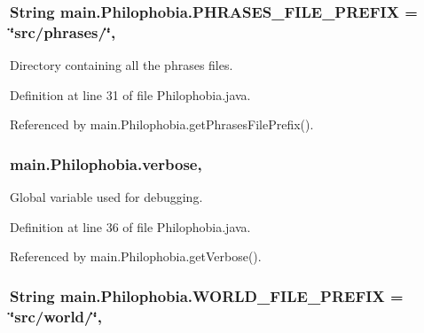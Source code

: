 \hypertarget{a00017_a076b568405c08c4b22e22a1d7c985124}{
\subsubsection[{P\-H\-R\-A\-S\-E\-S\-\_\-\-F\-I\-L\-E\-\_\-\-P\-R\-E\-F\-I\-X}]{\setlength{\rightskip}{0pt plus 5cm}String main.\-Philophobia.\-P\-H\-R\-A\-S\-E\-S\-\_\-\-F\-I\-L\-E\-\_\-\-P\-R\-E\-F\-I\-X = \char`\"{}src/phrases/\char`\"{}\hspace{0.3cm}{\ttfamily [static]}, {\ttfamily [protected]}}}\label{a00017_a076b568405c08c4b22e22a1d7c985124}


Directory containing all the phrases files. 



Definition at line 31 of file Philophobia.\-java.



Referenced by main.\-Philophobia.\-get\-Phrases\-File\-Prefix().

\hypertarget{a00017_a83cf82b16e2feb6ede60c8c076be10ec}{
\subsubsection[{verbose}]{ main.\-Philophobia.\-verbose\hspace{0.3cm}{\ttfamily [static]}, {\ttfamily [protected]}}}\label{a00017_a83cf82b16e2feb6ede60c8c076be10ec}


Global variable used for debugging. 



Definition at line 36 of file Philophobia.\-java.



Referenced by main.\-Philophobia.\-get\-Verbose().

\hypertarget{a00017_a7502fe9b6042326072c5be7be632cc6c}{
\subsubsection[{W\-O\-R\-L\-D\-\_\-\-F\-I\-L\-E\-\_\-\-P\-R\-E\-F\-I\-X}]{\setlength{\rightskip}{0pt plus 5cm}String main.\-Philophobia.\-W\-O\-R\-L\-D\-\_\-\-F\-I\-L\-E\-\_\-\-P\-R\-E\-F\-I\-X = \char`\"{}src/world/\char`\"{}\hspace{0.3cm}{\ttfamily [static]}, {\ttfamily [protected]}}}\label{a00017_a7502fe9b6042326072c5be7be632cc6c}


